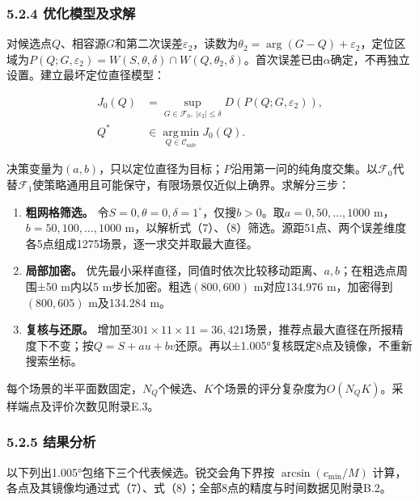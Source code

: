 \documentclass[UTF8,fontset=none,zihao=-4,a4paper]{ctexart}
\providecommand{\tightlist}{\setlength{\itemsep}{0pt}\setlength{\parskip}{0pt}}
\begin{document}
\subsubsection{5.2.4 优化模型及求解}\label{ux4f18ux5316ux6a21ux578bux53caux6c42ux89e3}

对候选点\(Q\)、相容源\(G\)和第二次误差\(\varepsilon_2\)，读数为\(\theta_2=\arg(G-Q)+\varepsilon_2\)，定位区域为\(P(Q;G,\varepsilon_2)=W(S,\theta,\delta)\cap W(Q,\theta_2,\delta)\)。首次误差已由\(\alpha\)确定，不再独立设置。建立最坏定位直径模型：

\[
\begin{aligned}
J_0(Q)&=\sup_{G\in\mathcal F_0,\ |\varepsilon_2|\le\delta}
D(P(Q;G,\varepsilon_2)),\\
Q^*&\in\operatorname*{arg\,min}_{Q\in\mathcal C_{\mathrm{safe}}}J_0(Q).
\end{aligned} \tag{9}
\]

决策变量为\((a,b)\)，只以定位直径为目标；\(P\)沿用第一问的纯角度交集。以\(\mathcal F_0\)代替\(\mathcal F_1\)使策略通用且可能保守，有限场景仅近似上确界。求解分三步：

\begin{enumerate}
\def\labelenumi{\arabic{enumi}.}
\tightlist
\item
  \textbf{粗网格筛选。} 令\(S=0,\theta=0,\delta=1^\circ\)，仅搜\(b>0\)。取\(a=0,50,\ldots,1000\) m，\(b=50,100,\ldots,1000\) m，以解析式（7）、（8）筛选。源距51点、两个误差维度各5点组成1275场景，逐一求交并取最大直径。
\item
  \textbf{局部加密。} 优先最小采样直径，同值时依次比较移动距离、\(a,b\)；在粗选点周围±50 m内以5 m步长加密。粗选\((800,600)\) m对应134.976 m，加密得到\((800,605)\) m及134.284 m。
\item
  \textbf{复核与还原。} 增加至\(301\times11\times11=36,421\)场景，推荐点最大直径在所报精度下不变；按\(Q=S+au+bv\)还原。再以±1.005°复核既定8点及镜像，不重新搜索坐标。
\end{enumerate}

每个场景的半平面数固定，\(N_Q\)个候选、\(K\)个场景的评分复杂度为\(O(N_QK)\)。采样端点及评价次数见附录E.3。

\subsubsection{5.2.5 结果分析}\label{ux7ed3ux679cux5206ux6790}

以下列出1.005°包络下三个代表候选。锐交会角下界按 \(\arcsin(c_{\min}/M)\) 计算，各点及其镜像均通过式（7）、式（8）；全部8点的精度与时间数据见附录B.2。
\end{document}
